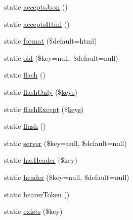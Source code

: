 \begin{DoxyCompactItemize}
static \mbox{\hyperlink{class_illuminate_1_1_support_1_1_facades_1_1_request_a1c0fbb1785826044da0ded64be898756}{accepts\+Json}} ()
\item 
static \mbox{\hyperlink{class_illuminate_1_1_support_1_1_facades_1_1_request_a60d9dd68e524f3f29aadbda775913cb3}{accepts\+Html}} ()
\item 
static \mbox{\hyperlink{class_illuminate_1_1_support_1_1_facades_1_1_request_ac091887300694c2d2f8630bb15adc897}{format}} (\$default=\textquotesingle{}html\textquotesingle{})
\item 
static \mbox{\hyperlink{class_illuminate_1_1_support_1_1_facades_1_1_request_a7b7af1efc91c493e2eea32c265bdff61}{old}} (\$key=null, \$default=null)
\item 
static \mbox{\hyperlink{class_illuminate_1_1_support_1_1_facades_1_1_request_a149dac682268f43992e9a091bb59be61}{flash}} ()
\item 
static \mbox{\hyperlink{class_illuminate_1_1_support_1_1_facades_1_1_request_ab5dacbf677b365d96b69d07eab287362}{flash\+Only}} (\$\mbox{\hyperlink{class_illuminate_1_1_support_1_1_facades_1_1_request_af2141683198d34ba665651ce8b9d6d83}{keys}})
\item 
static \mbox{\hyperlink{class_illuminate_1_1_support_1_1_facades_1_1_request_a338cfbdec5052d1b1c869afb2535d048}{flash\+Except}} (\$\mbox{\hyperlink{class_illuminate_1_1_support_1_1_facades_1_1_request_af2141683198d34ba665651ce8b9d6d83}{keys}})
\item 
static \mbox{\hyperlink{class_illuminate_1_1_support_1_1_facades_1_1_request_a95af77259531744a727e567b89f63377}{flush}} ()
\item 
static \mbox{\hyperlink{class_illuminate_1_1_support_1_1_facades_1_1_request_aaea79f85875a529d365d560bde09bf16}{server}} (\$key=null, \$default=null)
\item 
static \mbox{\hyperlink{class_illuminate_1_1_support_1_1_facades_1_1_request_a56135a65dcaa5b1aa7b33112630af0cd}{has\+Header}} (\$key)
\item 
static \mbox{\hyperlink{class_illuminate_1_1_support_1_1_facades_1_1_request_a7e986c7ede7a776671568609fc13fc93}{header}} (\$key=null, \$default=null)
\item 
static \mbox{\hyperlink{class_illuminate_1_1_support_1_1_facades_1_1_request_a5c82a7baf482aa6187435909722439d3}{bearer\+Token}} ()
\item 
static \mbox{\hyperlink{class_illuminate_1_1_support_1_1_facades_1_1_request_aa5ac5c2ba1148e6e342cc0bdb6e341b0}{exists}} (\$key)
\item 

\end{DoxyCompactItemize}
